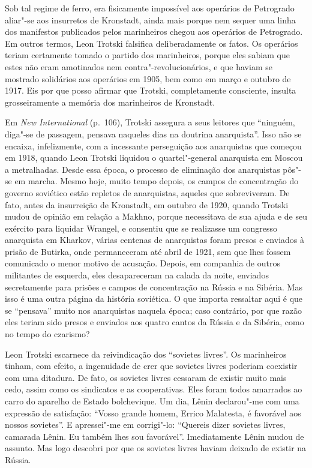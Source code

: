 Sob tal regime de ferro, era fisicamente impossível aos operários de
Petrogrado aliar"-se aos insurretos de Kronstadt, ainda mais porque
nem sequer uma linha dos manifestos publicados pelos marinheiros chegou aos
operários de Petrogrado. Em outros termos, Leon Trotski falsifica
deliberadamente os fatos. Os operários teriam certamente tomado o
partido dos marinheiros, porque eles sabiam que estes não eram
amotinados nem contra"-revolucionários, e que haviam se mostrado
solidários aos operários em 1905, bem como em março e outubro de 1917.
Eis por que posso afirmar que Trotski, completamente consciente,
insulta grosseiramente a memória dos marinheiros de Kronstadt. 

Em \textit{New International} (p.~106), Trotski assegura a seus leitores que “ninguém,
diga"-se de passagem, pensava naqueles dias na doutrina anarquista”.
Isso não se encaixa, infelizmente, com a incessante perseguição aos
anarquistas que começou em 1918, quando Leon Trotski liquidou o
quartel"-general anarquista em Moscou a metralhadas. Desde essa época,
o processo de eliminação dos anarquistas pôs"-se em marcha. Mesmo
hoje, muito tempo depois, os campos de concentração do governo
soviético estão repletos de anarquistas, aqueles que sobreviveram. De
fato, antes da insurreição de Kronstadt, em outubro de 1920, quando
Trotski mudou de opinião em relação a Makhno, porque necessitava de sua
ajuda e de seu exército para liquidar Wrangel, e consentiu que
se realizasse um congresso anarquista em Kharkov, várias centenas de
anarquistas foram presos e enviados à prisão de Butirka, onde
permaneceram até abril de 1921, sem que lhes fossem comunicado o menor
motivo de acusação. Depois, em companhia de outros militantes de
esquerda, eles desapareceram na calada da noite, enviados 
secretamente para prisões e campos de concentração na Rússia e na
Sibéria. Mas isso é uma outra página da história soviética. O que
importa ressaltar aqui é que se “pensava” muito nos anarquistas naquela
época; caso contrário, por que razão eles teriam sido presos e enviados
aos quatro cantos da Rússia e da Sibéria, como no tempo do czarismo?

Leon Trotski escarnece da reivindicação dos “sovietes livres”. Os
marinheiros tinham, com efeito, a ingenuidade de crer que sovietes
livres poderiam coexistir com uma ditadura. De fato, os sovietes livres
cessaram de existir muito mais cedo, assim como os sindicatos e as
cooperativas. Eles foram todos amarrados ao carro do aparelho de Estado
bolchevique. Um dia, Lênin declarou"-me com uma expressão de
satisfação: “Vosso grande homem, Errico Malatesta, é favorável aos
nossos sovietes”. E apressei"-me em corrigi"-lo: “Quereis dizer
sovietes livres, camarada Lênin. Eu também lhes sou favorável”.
Imediatamente Lênin mudou de assunto. Mas logo descobri por que os
sovietes livres haviam deixado de existir na Rússia.

